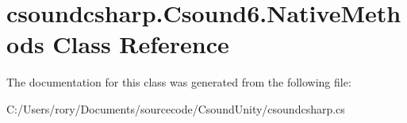 \hypertarget{classcsoundcsharp_1_1_csound6_1_1_native_methods}{}\section{csoundcsharp.\+Csound6.\+Native\+Methods Class Reference}
\label{classcsoundcsharp_1_1_csound6_1_1_native_methods}


The documentation for this class was generated from the following file\+:\begin{DoxyCompactItemize}
\item 
C\+:/\+Users/rory/\+Documents/sourcecode/\+Csound\+Unity/csoundcsharp.\+cs\end{DoxyCompactItemize}
